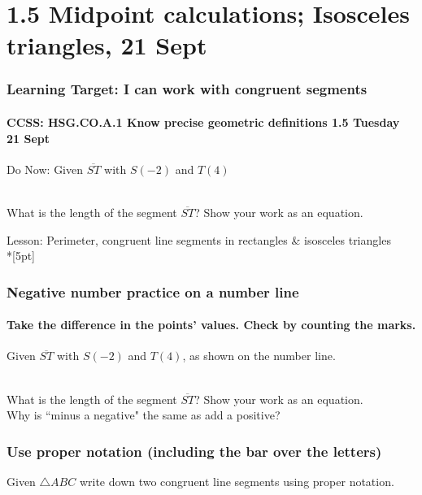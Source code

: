   \section{1.5 Midpoint calculations; Isosceles triangles, 21 Sept}
  \frame
  {
    \frametitle{Learning Target: I can work with congruent segments}
    \framesubtitle{CCSS: HSG.CO.A.1 Know precise geometric definitions  \hfill \alert{1.5 Tuesday 21 Sept}}
  
    \begin{block}{Do Now: Given $\overline{ST}$ with $S(-2)$ and $T(4)$}
       \\ \bigskip
  What is the length of the segment $\overline{ST}$? Show your work as an equation.
    \end{block}
    Lesson: Perimeter, congruent line segments in rectangles \& isosceles triangles \\*[5pt]
  }

  \frame
  {
    \frametitle{Negative number practice on a number line}
    \framesubtitle{Take the difference in the points' values. Check by counting the marks.}
    Given $\overline{ST}$ with $S(-2)$ and $T(4)$, as shown on the number line. \\[0.25cm]
       \\ \bigskip
  What is the length of the segment $\overline{ST}$? Show your work as an equation.\\[1.5cm]
  Why is ``minus a negative" the same as add a positive? \vspace{2cm}  
  }

  \frame
  {
    \frametitle{Use proper notation (including the bar over the letters)}
      Given $\triangle ABC$ write down two congruent line segments using proper notation.\\
  }

